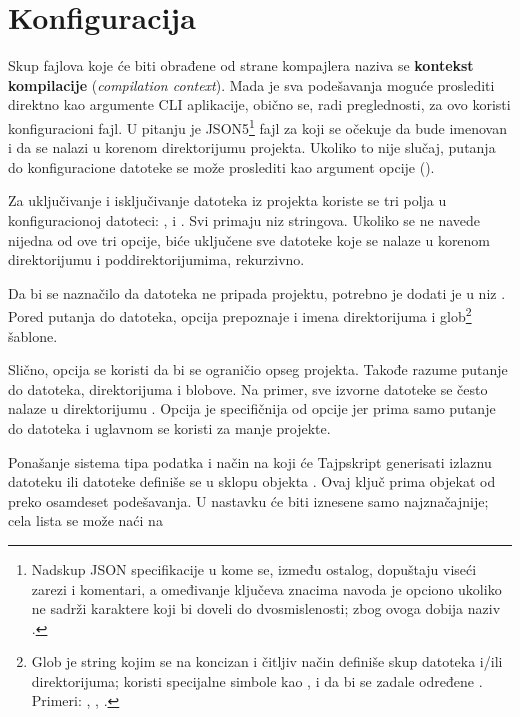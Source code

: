 \section{Konfiguracija}

Skup fajlova koje će biti obrađene od strane kompajlera naziva se \textbf{kontekst kompilacije} (\textsl{compilation context}).
Mada je sva podešavanja moguće proslediti direktno kao argumente CLI aplikacije, obično se, radi preglednosti, za ovo koristi konfiguracioni fajl.
U pitanju je JSON5\footnote{Nadskup JSON specifikacije u kome se, između ostalog, dopuštaju viseći zarezi i komentari, a omeđivanje ključeva znacima navoda je opciono ukoliko ne sadrži karaktere koji bi doveli do dvosmislenosti; zbog ovoga dobija naziv .} fajl za koji se očekuje da bude imenovan  i da se nalazi u korenom direktorijumu projekta.
Ukoliko to nije slučaj, putanja do konfiguracione datoteke se može proslediti kao argument opcije  ().

Za uključivanje i isključivanje datoteka iz projekta koriste se tri polja u konfiguracionoj datoteci: ,  i .
Svi primaju niz stringova.
Ukoliko se ne navede nijedna od ove tri opcije, biće uključene sve  datoteke koje se nalaze u korenom direktorijumu i poddirektorijumima, rekurzivno.

Da bi se naznačilo da datoteka ne pripada projektu, potrebno je dodati je u niz .
Pored putanja do datoteka,  opcija prepoznaje i imena direktorijuma i glob\footnote{Glob je string kojim se na koncizan i čitljiv način definiše skup datoteka i/ili direktorijuma; koristi specijalne simbole kao \code{*}, \code{**} i  da bi se zadale određene . Primeri: , , .} šablone.

Slično,  opcija se koristi da bi se ograničio opseg projekta.
Takođe razume putanje do datoteka, direktorijuma i blobove.
Na primer, sve izvorne datoteke se često nalaze u direktorijumu .
Opcija  je specifičnija od opcije  jer prima samo putanje do datoteka i uglavnom se koristi za manje projekte.

Ponašanje sistema tipa podatka i način na koji će Tajpskript generisati izlaznu datoteku ili datoteke definiše se u sklopu objekta .
Ovaj ključ prima objekat od preko osamdeset podešavanja.
U nastavku će biti iznesene samo najznačajnije; cela lista se može naći na %

